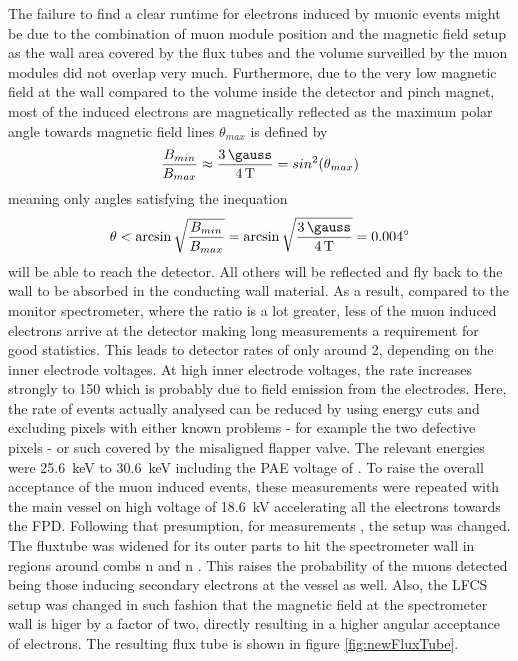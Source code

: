   
  The failure to find a clear runtime for electrons induced by muonic events might be due to the combination of muon module position and the magnetic field setup as the wall area covered by the flux tubes and the volume surveilled by the muon modules did not overlap very much. Furthermore, due to the very low magnetic field at the wall compared to the volume inside the detector and pinch magnet, most of the induced electrons are magnetically reflected as the maximum polar angle towards magnetic field lines $\theta_{max}$ is defined by
  \begin{equation}
  	\frac{B_{min}}{B_{max}} \approx \frac{\SI{3}{\gauss}}{\SI{4}{\tesla}} = sin^2(\theta_{max})
  \end{equation}
  meaning only angles satisfying the inequation
  \begin{equation}
  	\theta < \arcsin{\sqrt{\frac{B_{min}}{B_{max}}}} = \arcsin{\sqrt{\frac{\SI{3}{\gauss}}{\SI{4}{\tesla}}}} = \SI{0.004}{\degree}
  \end{equation}
	will be able to reach the detector. All others will be reflected and fly back to the wall to be absorbed in the conducting wall material. 
	As a result, compared to the monitor spectrometer, where the ratio is a lot greater, less of the muon induced electrons arrive at the detector making long measurements a requirement for good statistics. This leads to detector rates of only around \SI{2}{\cps}, depending on the inner electrode voltages.
	At high inner electrode voltages, the rate increases strongly to \SI{150}{\cps} which is probably due to field emission from the electrodes. Here, the rate of events actually analysed can be reduced by using energy cuts and excluding pixels with either known problems - for example the two defective pixels - or such covered by the misaligned flapper valve. The relevant energies were \SI{25.6}{\kilo\electronvolt} to \SI{30.6}{\kilo\electronvolt} including the PAE voltage of .
	To raise the overall acceptance of the muon induced events, these measurements were repeated with the main vessel on high voltage of \SI{18.6}{\kilo\volt} accelerating all the electrons towards the FPD.
	Following that presumption, for measurements , the setup was changed. The fluxtube was widened for its outer parts to hit the spectrometer wall in regions around combs n and n . This raises the probability of the muons detected being those inducing secondary electrons at the vessel as well. Also, the LFCS setup was changed in such fashion that the magnetic field at the spectrometer wall is higer by a factor of two, directly resulting in a higher angular acceptance of electrons. The resulting flux tube is shown in figure \ref{fig:newFluxTube}. 
    


